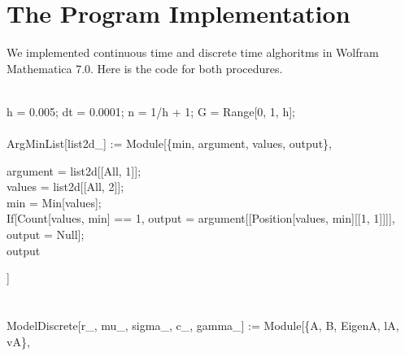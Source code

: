 \chapter{The Program Implementation}   

We implemented continuous time and discrete time alghoritms in Wolfram Mathematica 7.0. Here is the code for both procedures.\\
\\

\begin{scriptsize}

h = 0.005; dt = 0.0001; n = 1/h + 1; G = Range[0, 1, h];\\
\\
ArgMinList[list2d\_] := Module[\{min, argument, values, output\},
  \begin{addmargin}[1em]{0em}
  argument = list2d[[All, 1]];\\
  values = list2d[[All, 2]];\\
  min = Min[values];\\
  If[Count[values, min] == 1, output = argument[[Position[values, min][[1, 1]]]], output = Null];\\
  output
  \end{addmargin} 
]\\
\\
\\
ModelDiscrete[r\_, mu\_, sigma\_, c\_, gamma\_] :=  Module[\{A, B, EigenA, lA, vA\},\\


\end{scriptsize}
